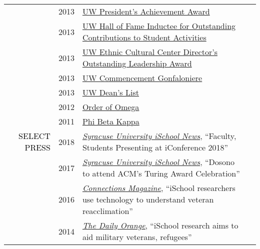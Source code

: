 \documentclass[12pt]{article}
\begin{document}
{{\begin{longtable}{Rp{1.0in}p{0.25in}p{4.75in}}
& \footnotesize{2013} & \href{http://www.washington.edu/omad/celebration/recognition-scholarship-recipients/2013-celebration-scholarship-recipients/}{{UW President’s Achievement Award}} \\

& \footnotesize{2013} & \href{http://depts.washington.edu/thehub/hub-events/hub-awards/}{{UW Hall of Fame Inductee for Outstanding Contributions to Student Activities}} \\

& \footnotesize{2013} & \href{https://www.facebook.com/EthnicCulturalCenter/photos/a.10151638127531422.1073741830.124987626421/10151638128881422/}{{UW Ethnic Cultural Center Director’s Outstanding Leadership Award}} \\

& \footnotesize{2013} & \href{https://www.facebook.com/UWiSchool/posts/10151645734368695}{{UW Commencement Gonfaloniere}} \\

& \footnotesize{2013} & \href{https://www.yakimaherald.com/news/education/school-news-sept/article_af5885a3-bcbc-5925-bb87-a84844c6d36a.html}{{UW Dean’s List}} \\

& \footnotesize{2012} & \href{http://orderofomega.org/}{{Order of Omega}} \\

& \footnotesize{2011} & \href{https://www.pbk.org/}{{Phi Beta Kappa}} \\

\textcolor{black}{\footnotesize{\uppercase{Select Press}}} & \footnotesize{2018} & \href{https://ischool.syr.edu/articles/news/view/faculty-students-presenting-iconference-2018/}{\textit{{Syracuse University iSchool News}}}, ``Faculty, Students Presenting at iConference 2018'' \\

& \footnotesize{2017} & \href{https://ischool.syr.edu/articles/news/view/dosono-to-attend-acm-turing-award-celebration/}{\textit{{Syracuse University iSchool News}}}, ``Dosono to attend ACM's Turing Award Celebration'' \\

& \footnotesize{2016} & \href{https://issuu.com/kiefercreative/docs/suischool-connections-sp2016}{\textit{{Connections Magazine}}}, ``iSchool researchers use technology to understand veteran reacclimation'' \\

& \footnotesize{2014} & \href{http://dailyorange.com/2014/11/ischool-research-aims-to-aid-military-veterans-refugees/}{\textit{{The Daily Orange}},} ``iSchool research aims to aid military veterans, refugees'' \\


\end{longtable}}}
\end{document}
